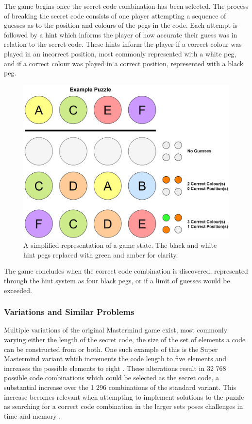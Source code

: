 \documentclass[11pt]{article}  %
\theoremstyle{definition}
\theoremstyle{remark}
\begin{document}
The game begins once the secret code combination has been selected. The process of breaking the secret code consists of one player attempting a sequence of guesses as to the position and colours of the pegs in the code. Each attempt is followed by a hint which informs the player of how accurate their guess was in relation to the secret code. These hints inform the player if a correct colour was played in an incorrect position, most commonly represented with a white peg, and if a correct colour was played in a correct position, represented with a black peg.

\begin{figure}[H]
\centering
\includegraphics[scale=0.5]{guesses}
\caption{A simplified representation of a game state. The black and white hint pegs replaced with green and amber for clarity.}
\end{figure}

The game concludes when the correct code combination is discovered, represented through the hint system as four black pegs, or if a limit of guesses would be exceeded.

\subsubsection {Variations and Similar Problems}

Multiple variations of the original Mastermind game exist, most commonly varying either the length of the secret code, the size of the set of elements a code can be constructed from or both. One such example of this is the Super Mastermind variant which increments the code length to five elements and increases the possible elements to eight \cite {SuperMM}. These alterations result in 32 768 possible code combinations which could be selected as the secret code, a substantial increase over the 1 296 combinations of the standard variant. This increase becomes relevant when attempting to implement solutions to the puzzle as searching for a correct code combination in the larger sets poses challenges in time and memory \cite {ExhaustiveMM}.
\end{document}
